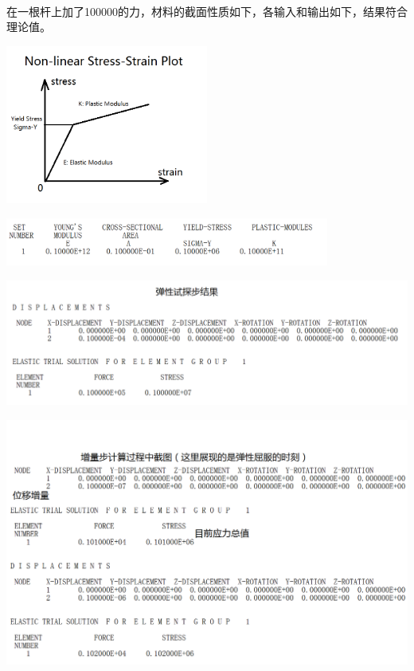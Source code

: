 \documentclass[UTF8]{ctexbook}
\begin{document}
\paragraph{}
在一根杆上加了100000的力，材料的截面性质如下，各输入和输出如下，结果符合理论值。
\begin{center}
\includegraphics[width=0.5\textwidth]{plastic2.png}
\end{center}
\begin{center}
\includegraphics[width=0.8\textwidth]{plastic1.png}
\end{center}
\begin{center}
\includegraphics[width=1.0\textwidth]{plastic4.png}
\end{center}
\begin{center}
\includegraphics[width=1.0\textwidth]{plastic5.png}
\end{center}
\end{document}
